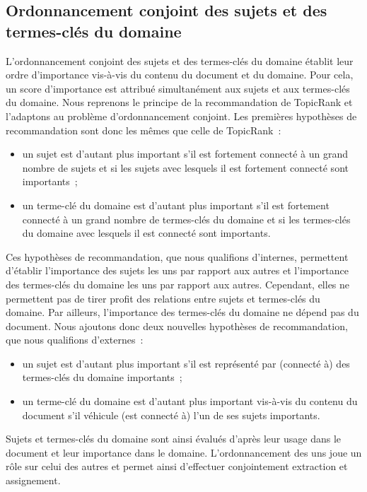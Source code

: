   \subsection{Ordonnancement conjoint des sujets et des termes-clés du domaine}
  \label{subsec:main-domain_specific_keyphrase_annotation-supervised_automatic_keyphrase_extraction-topiccorank-co_ranking}
    L'ordonnancement conjoint des sujets et des termes-clés du domaine
    établit leur ordre d'importance vis-à-vis du contenu du document et du
    domaine. Pour cela, un score d'importance est attribué simultanément aux
    sujets et aux termes-clés du domaine.
%
    Nous reprenons le principe de la recommandation de TopicRank et
    l'adaptons au problème d'ordonnancement conjoint. Les premières
    hypothèses de recommandation sont donc les mêmes que celle de
    TopicRank~:
    \begin{itemize}
      \item{un sujet est d'autant plus important s'il est fortement connecté
            à un grand nombre de sujets et si les sujets avec lesquels il
            est fortement connecté sont importants~;}
      \item{un terme-clé du domaine est d'autant plus important s'il est
            fortement connecté à un grand nombre de termes-clés du domaine
            et si les termes-clés du domaine avec lesquels il est connecté
            sont importants.}
    \end{itemize}
    Ces hypothèses de recommandation, que nous qualifions d'internes,
    permettent d'établir l'importance des sujets les uns par rapport aux
    autres et l'importance des termes-clés du domaine les uns par rapport
    aux autres. Cependant, elles ne permettent pas de tirer profit des
    relations entre sujets et termes-clés du domaine. Par ailleurs,
    l'importance des termes-clés du domaine ne  dépend pas du document. Nous
    ajoutons donc deux nouvelles hypothèses de recommandation, que nous
    qualifions d'externes~:
    \begin{itemize}
      \item{un sujet est d'autant plus important s'il est représenté par
            (connecté à) des termes-clés du domaine importants~;}
      \item{un terme-clé du domaine est d'autant plus important vis-à-vis
            du contenu du document s'il véhicule (est connecté à) l'un de
            ses sujets importants.}
    \end{itemize}
    Sujets et termes-clés du domaine sont ainsi évalués d'après leur usage
    dans le document et leur importance dans le domaine. L'ordonnancement
    des uns joue un rôle sur celui des autres et permet ainsi d'effectuer
    conjointement extraction et assignement.

